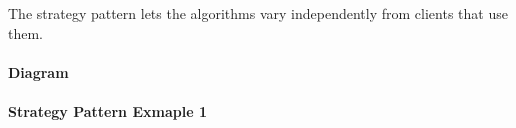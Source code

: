 \documentclass{book}
\begin{document}
The strategy pattern lets the algorithms vary independently from clients that use them.

\paragraph{Diagram}\mbox{}
\begin{figure}[H]
\begin{floatrow}
\end{floatrow}
\end{figure}
\paragraph{Strategy Pattern Exmaple 1}\mbox{}

\begin{figure}[H]
\begin{floatrow}
\end{floatrow}
\end{figure}
\end{document}
